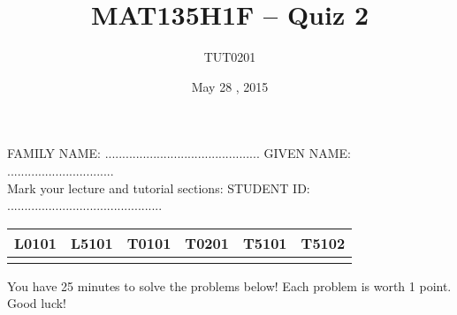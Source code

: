 \documentclass[10pt]{article}
\title{MAT135H1F -- Quiz 2}
\author{TUT0201}
\date{May 28 , 2015}
\begin{document}
\maketitle

FAMILY NAME: ............................................. \hspace{1 cm} GIVEN NAME: ............................... \\



Mark your lecture and tutorial sections: \hspace{1 cm}  STUDENT ID: ............................................. 
\begin{center}


\begin{tabular}{*{6}{|c}|} \hline
L0101 & L5101 & T0101 & T0201 & T5101 & T5102 \\ \hline
& & & & & \\  \hline
\end{tabular}
\end{center}

You have 25 minutes to solve the problems below! Each problem is worth 1 point. Good luck!

\begin{comment}
You have 10 minutes to record your solutions in the boxes below! Good luck!

\begin{center}
\begin{tabular}{*{5}{|c}|} \hline
 Question 1. &  Question 2. & Question 3. &  Question 4. & Question 5.  \\ \hline
&&&& \\ \hline
\end{tabular}
\end{center}
\end{comment}


\vspace{0.5 cm}
\end{document}
